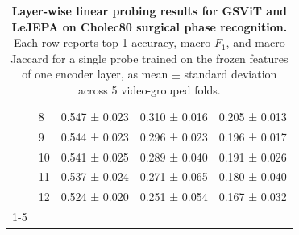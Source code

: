 \documentclass[11pt, a4paper]{article}
\begin{document}
\begin{table}
\begin{tabular}{llccc}
 & 8 & 0.547 ± 0.023 & 0.310 ± 0.016 & 0.205 ± 0.013 \\
 & 9 & 0.544 ± 0.023 & 0.296 ± 0.023 & 0.196 ± 0.017 \\
 & 10 & 0.541 ± 0.025 & 0.289 ± 0.040 & 0.191 ± 0.026 \\
 & 11 & 0.537 ± 0.024 & 0.271 ± 0.065 & 0.180 ± 0.040 \\
 & 12 & 0.524 ± 0.020 & 0.251 ± 0.054 & 0.167 ± 0.032 \\
\cline{1-5}
\bottomrule
\end{tabular}
\caption{\textbf{Layer-wise linear probing results for GSViT and LeJEPA on 
Cholec80 surgical phase recognition.} Each row reports top-1 accuracy, 
macro $F_1$, and macro Jaccard for a single probe trained on the 
frozen features of one encoder layer, as mean $\pm$ standard 
deviation across 5 video-grouped folds.}
\label{tab:probing_results}

\end{table}
\end{document}
